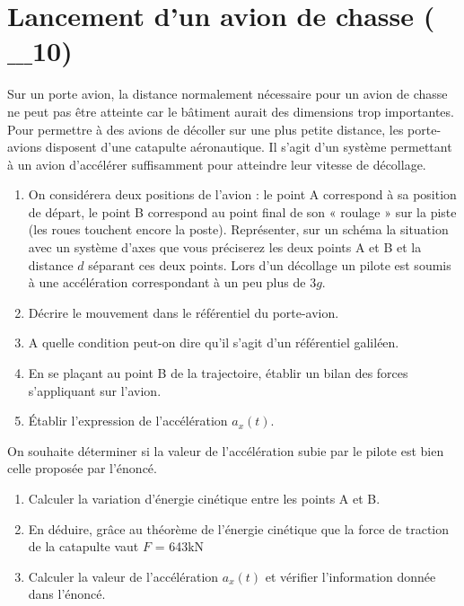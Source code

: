 \documentclass[a4paper,11pt,fleqn]{article}%
\begin{document}
\noindent \begin{minipage}[t]{.9\linewidth}
\section{Lancement d'un avion de chasse ($\_\_\_$10)}
Sur un porte avion, la distance normalement nécessaire pour un avion de chasse ne peut pas être atteinte car le bâtiment aurait des dimensions trop importantes. Pour permettre à des avions de décoller sur une plus petite distance, les porte-avions disposent d'une catapulte aéronautique. Il s'agit d'un système permettant à un avion d'accélérer suffisamment pour atteindre leur vitesse de décollage.\\

\begin{enumerate}
	\item On considérera deux positions de l'avion : le point A correspond à sa position de départ, le point B correspond au point final de son « roulage » sur la piste (les roues touchent encore la poste). Représenter, sur un schéma la situation avec un système d'axes que vous préciserez les deux points A et B et la distance $d$ séparant ces deux points. Lors d’un décollage un pilote est soumis à une accélération correspondant à un peu plus de $3g$.
	\item Décrire le mouvement dans le référentiel du porte-avion.
	\item A quelle condition peut-on dire qu'il s'agit d'un référentiel galiléen.
	\item En se plaçant au point B de la trajectoire, établir un bilan des forces s'appliquant sur l'avion.
	\item Établir l'expression de l'accélération $a_x(t)$.
\end{enumerate}

On souhaite déterminer si la valeur de l'accélération subie par le pilote est bien celle proposée par l'énoncé.

\begin{enumerate}[resume]
	\item Calculer la variation d'énergie cinétique entre les points A et B.
	\item En déduire, grâce au théorème de l'énergie cinétique que la force de traction de la catapulte vaut $F$ = {643}{kN}
	\item Calculer la valeur de l'accélération $a_x(t)$ et vérifier l'information donnée dans l'énoncé.
\end{enumerate}


\end{minipage}
\end{document}
